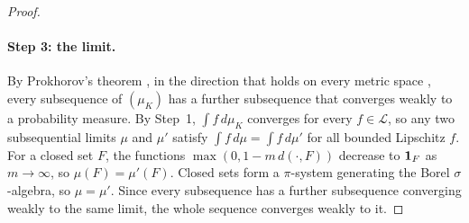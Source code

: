 \begin{proof}
\paragraph{Step 3: the limit.}
By Prokhorov's theorem \cite{Prokhorov1956}, in the direction that holds on every metric space \cite[Theorem~5.1]{Billingsley1999}, every subsequence of $(\mu_K)$ has a further subsequence that converges weakly to a probability measure. By Step~1, $\int f\,d\mu_K$ converges for every $f\in\mathscr L$, so any two subsequential limits $\mu$ and $\mu'$ satisfy $\int f\,d\mu=\int f\,d\mu'$ for all bounded Lipschitz $f$. For a closed set $F$, the functions $\max(0,1-m\,d(\cdot,F))$ decrease to $\mathbf 1_F$ as $m\to\infty$, so $\mu(F)=\mu'(F)$. Closed sets form a $\pi$-system generating the Borel $\sigma$-algebra, so $\mu=\mu'$. Since every subsequence has a further subsequence converging weakly to the same limit, the whole sequence converges weakly to it.
\end{proof}

